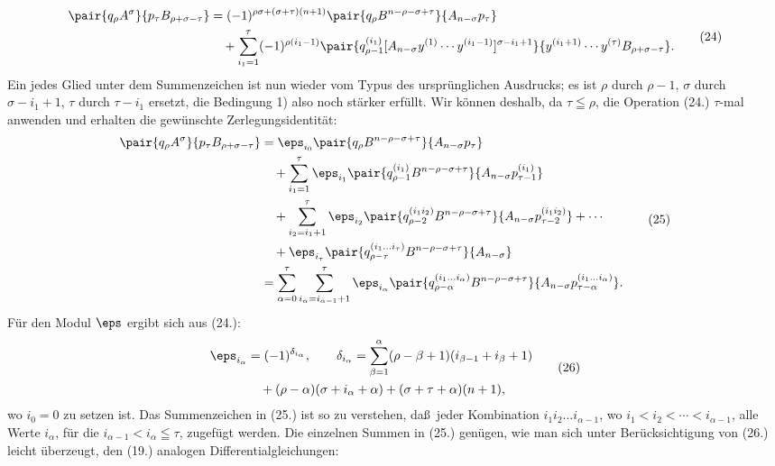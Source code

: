 \begin{equation}
\begin{aligned}
\pair{q_\rho A^\sigma}{p_\tau B_{\rho+\sigma-\tau}}
&=(-1)^{\rho\sigma+(\sigma+\tau)(n+1)}
  \pair{q_\rho B^{n-\rho-\sigma+\tau}}{A_{n-\sigma}p_\tau}\\
&\quad+\sum_{i_1=1}^{\tau}(-1)^{\rho(i_1-1)}
 \pair{q_{\rho-1}^{(i_1)}[A_{n-\sigma}y^{(1)}\cdots y^{(i_1-1)}]^{\sigma-i_1+1}}
 {y^{(i_1+1)}\cdots y^{(\tau)}B_{\rho+\sigma-\tau}}.
\end{aligned}
\tag{24}
\end{equation}
Ein jedes Glied unter dem Summenzeichen ist nun wieder vom Typus des urspr\"unglichen Ausdrucks; es ist $\rho$ durch $\rho-1$, $\sigma$ durch $\sigma-i_1+1$, $\tau$ durch $\tau-i_1$ ersetzt, die Bedingung 1) also noch st\"arker erf\"ullt. Wir k\"onnen deshalb, da $\tau\leqq\rho$, die Operation (24.) $\tau$-mal anwenden und erhalten die gew\"unschte Zerlegungsidentit\"at:
\begin{equation}
\begin{aligned}
\pair{q_\rho A^\sigma}{p_\tau B_{\rho+\sigma-\tau}}
&=\eps_{i_0}\pair{q_\rho B^{n-\rho-\sigma+\tau}}{A_{n-\sigma}p_\tau}\\
&\quad+\sum_{i_1=1}^{\tau}\eps_{i_1}
 \pair{q_{\rho-1}^{(i_1)}B^{n-\rho-\sigma+\tau}}{A_{n-\sigma}p_{\tau-1}^{(i_1)}}\\
&\quad+\sum_{i_2=i_1+1}^{\tau}\eps_{i_2}
 \pair{q_{\rho-2}^{(i_1i_2)}B^{n-\rho-\sigma+\tau}}{A_{n-\sigma}p_{\tau-2}^{(i_1i_2)}}+\cdots\\
&\quad+\eps_{i_\tau}\pair{q_{\rho-\tau}^{(i_1\ldots i_\tau)}B^{n-\rho-\sigma+\tau}}{A_{n-\sigma}}\\
&=\sum_{\alpha=0}^{\tau}\sum_{i_\alpha=i_{\alpha-1}+1}^{\tau}\eps_{i_\alpha}
 \pair{q_{\rho-\alpha}^{(i_1\ldots i_\alpha)}B^{n-\rho-\sigma+\tau}}{A_{n-\sigma}p_{\tau-\alpha}^{(i_1\ldots i_\alpha)}}.
\end{aligned}
\tag{25}
\end{equation}
F\"ur den Modul $\eps$ ergibt sich aus (24.):
\begin{equation}
\begin{aligned}
\eps_{i_\alpha}&=(-1)^{\delta_{i_\alpha}},\qquad
\delta_{i_\alpha}=\sum_{\beta=1}^{\alpha}(\rho-\beta+1)(i_{\beta-1}+i_\beta+1)\\
&\quad +(\rho-\alpha)(\sigma+i_\alpha+\alpha)+(\sigma+\tau+\alpha)(n+1),
\end{aligned}
\tag{26}
\end{equation}
wo $i_0=0$ zu setzen ist. Das Summenzeichen in (25.) ist so zu verstehen, da\ss\ jeder Kombination $i_1i_2\ldots i_{\alpha-1}$, wo $i_1<i_2<\cdots<i_{\alpha-1}$, alle Werte $i_\alpha$, f\"ur die $i_{\alpha-1}<i_\alpha\leqq\tau$, zugef\"ugt werden. Die einzelnen Summen in (25.) gen\"ugen, wie man sich unter Ber\"ucksichtigung von (26.) leicht \"uberzeugt, den (19.) analogen Differentialgleichungen:
